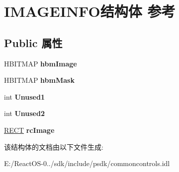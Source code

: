 \hypertarget{struct_i_m_a_g_e_i_n_f_o}{}\section{I\+M\+A\+G\+E\+I\+N\+F\+O结构体 参考}
\label{struct_i_m_a_g_e_i_n_f_o}
\subsection*{Public 属性}
\begin{DoxyCompactItemize}
\item 
\mbox{\label{struct_i_m_a_g_e_i_n_f_o_a3edd44437fe034d836837b2e3d3fbb9a}} 
H\+B\+I\+T\+M\+AP {\bfseries hbm\+Image}
\item 
\mbox{\label{struct_i_m_a_g_e_i_n_f_o_a1ce1554d64164c3d59fef945a7b6965e}} 
H\+B\+I\+T\+M\+AP {\bfseries hbm\+Mask}
\item 
\mbox{\label{struct_i_m_a_g_e_i_n_f_o_a11e03e4a1272af7afa515d14b7f62d13}} 
int {\bfseries Unused1}
\item 
\mbox{\label{struct_i_m_a_g_e_i_n_f_o_abf249cab7fb04cddf45ddb37ac016752}} 
int {\bfseries Unused2}
\item 
\mbox{\label{struct_i_m_a_g_e_i_n_f_o_ab4498c062f6cf7c4366f9075a69835ed}} 
\hyperlink{structtag_r_e_c_t}{R\+E\+CT} {\bfseries rc\+Image}
\end{DoxyCompactItemize}


该结构体的文档由以下文件生成\+:\begin{DoxyCompactItemize}
\item 
E\+:/\+React\+O\+S-\/0../sdk/include/psdk/commoncontrols.\+idl\end{DoxyCompactItemize}
